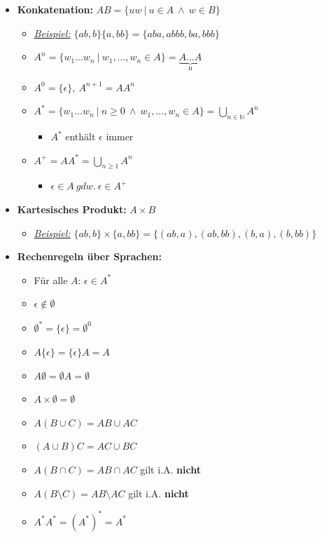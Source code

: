 \documentclass[ieeetran]{article}
\begin{document}
\begin{itemize}
	\item \textbf{Konkatenation:} $AB = \{uw \ | \ u \in A \ \wedge \ w \in B \}$
		\begin{itemize}
			\item \textit{\underline{Beispiel:}} $\{ab,b\}\{a,bb\} = \{aba, abbb, ba, bbb\}$
			\item $A^n = \{w_1...w_n \ | \ w_1,...,w_n \in A\} = \underbrace{A...A}_\text{n}$
			\item $A^0 = \{ \epsilon \}, \ A^{n+1} = AA^n$
			\item $A^* = \{w_1...w_n \ | \ n \ge 0 \ \wedge \ w_1,...,w_n \in A\} = \bigcup_{n \in \mathbb{N}}A^n$
				\begin{itemize}
					\item $A^*$ enthält $\epsilon$ immer
				\end{itemize}
			\item $A^+ = AA^* = \bigcup_{n \ge 1}A^n$
				\begin{itemize}
				  \item $\epsilon \in A \ gdw. \ \epsilon \in A^+$
				\end{itemize}

		\end{itemize}
	\item \textbf{Kartesisches Produkt:} $A \times B$
		\begin{itemize}
			\item \textit{\underline{Beispiel:}} $\{ab,b\} \times \{a,bb\} = \{(ab,a),(ab,bb),(b,a),(b,bb)\}$
		\end{itemize}
	
\item \textbf{Rechenregeln über Sprachen:}
	\begin{itemize}
		\item Für alle $A$: $\epsilon \in A^*$
	\item $\epsilon \not\in \emptyset$
	\item $\emptyset^* = \{\epsilon\} = \emptyset^0$
	\item $A\{\epsilon\} = \{\epsilon\}A = A$
	\item $A\emptyset= \emptyset A = \emptyset$
	\item $A \times \emptyset = \emptyset$
	\item $A(B \cup C) = AB \cup AC$
	\item $(A \cup B)C = AC \cup BC$
	\item $A(B \cap C) = AB \cap AC$ gilt i.A. \textbf{nicht}
	\item $A(B \setminus C) = AB \setminus AC$ gilt i.A. \textbf{nicht}

	\item $A^*A^* = (A^*)^* = A^*$
	\end{itemize}
\end{itemize}
\end{document}
